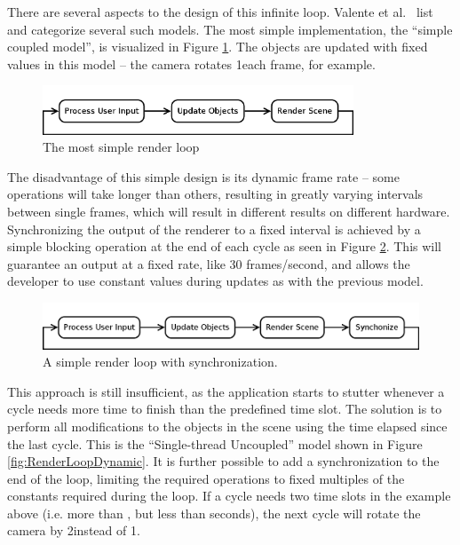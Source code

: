 	There are several aspects to the design of this infinite loop. Valente et al.\ \cite{Valente_Conci_Feijo_2005} list and categorize several such models. The most simple implementation, the ``simple coupled model'', is visualized in Figure \ref{fig:RenderLoopSimple}. The objects are updated with fixed values in this model -- the camera rotates 1\degree each frame, for example.

	\begin{figure}[htbp]
		\centering
		\includegraphics[width=9.25cm]{images/renderloop-simple.png}
		\caption{The most simple render loop}
		\label{fig:RenderLoopSimple}
	\end{figure}

	The disadvantage of this simple design is its dynamic frame rate -- some operations will take longer than others, resulting in greatly varying intervals between single frames, which will result in different results on different hardware. Synchronizing the output of the renderer to a fixed interval is achieved by a simple blocking operation at the end of each cycle as seen in Figure \ref{fig:RenderLoopSimpleSync}. This will guarantee an output at a fixed rate, like 30 frames/second, and allows the developer to use constant values during updates as with the previous model.

	\begin{figure}[htbp]
		\centering
		\includegraphics[width=12cm]{images/renderloop-simplesync.png}
		\caption{A simple render loop with synchronization.}
		\label{fig:RenderLoopSimpleSync}
	\end{figure}

	This approach is still insufficient, as the application starts to stutter whenever a cycle needs more time to finish than the predefined time slot. The solution is to perform all modifications to the objects in the scene using the time elapsed since the last cycle. This is the ``Single-thread Uncoupled'' model shown in Figure \ref{fig:RenderLoopDynamic}. It is further possible to add a synchronization to the end of the loop, limiting the required operations to fixed  multiples of the constants required during the loop. If a cycle needs two time slots in the example above (i.e. more than , but less than  seconds), the next cycle will rotate the camera by 2\degree instead of 1\degreenospace.

